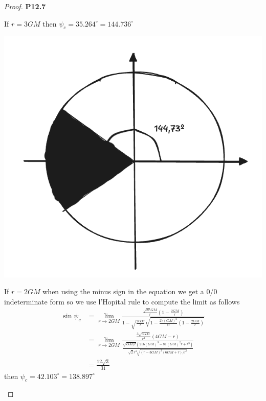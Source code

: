\documentclass[11pt]{article}
\theoremstyle{definition}
\begin{document}
\begin{proof}{\textbf{P12.7}}
\begin{itemize}
\begin{center}
    \end{center}
    If $r = 3GM$ then $\psi_c = 35.264^\circ = 144.736^\circ$
    \begin{center}
        \includegraphics[scale=0.3]{ch12-p12.7-ii.png}
    \end{center}
    If $r = 2GM$ when using the minus sign in the equation we get a 0/0
    indeterminate form so we use l'Hopital rule to compute the limit as follows
    \begin{align*}
        \sin\psi_c
        &= \lim_{r\to 2GM}
        \frac{\frac{\sqrt{27}GM}{r}(1 - \frac{2GM}{r})}
        {1 - \sqrt{\frac{2GM}{r}}\sqrt{1 - \frac{27(GM)^2}{r^2}(1 - \frac{2GM}{r})}}\\
        &= \lim_{r\to 2GM}
        \frac{\frac{3\sqrt{3GM}}{r^3}(4GM - r)}
        {\frac{\sqrt{GM/r}(216(GM)^3 - 81(GM)^2r + r^3)}{\sqrt{2}r^4\sqrt{(r-3GM)^2(6GM + r)/r^3}}}\\
        &= \frac{12\sqrt{3}}{31} 
    \end{align*}
    then $\psi_c = 42.103^\circ = 138.897^\circ$
    \begin{center}

\end{center}
\end{itemize}
\end{proof}
\end{document}
